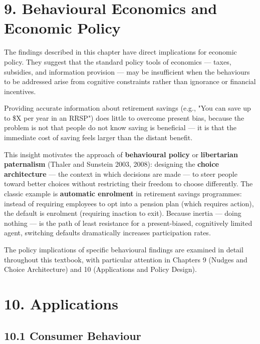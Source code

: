 \documentclass[12pt, letterpaper]{article}
\begin{document}
\medskip


\section{9. Behavioural Economics and Economic Policy}


The findings described in this chapter have direct implications for economic policy. They suggest that the standard policy tools of economics --- taxes, subsidies, and information provision --- may be insufficient when the behaviours to be addressed arise from cognitive constraints rather than ignorance or financial incentives.

Providing accurate information about retirement savings (e.g., "You can save up to \$X per year in an RRSP") does little to overcome present bias, because the problem is not that people do not know saving is beneficial --- it is that the immediate cost of saving feels larger than the distant benefit.

This insight motivates the approach of \textbf{behavioural policy} or \textbf{libertarian paternalism} (Thaler and Sunstein 2003, 2008): designing the \textbf{choice architecture} --- the context in which decisions are made --- to steer people toward better choices without restricting their freedom to choose differently. The classic example is \textbf{automatic enrolment} in retirement savings programmes: instead of requiring employees to opt into a pension plan (which requires action), the default is enrolment (requiring inaction to exit). Because inertia --- doing nothing --- is the path of least resistance for a present-biased, cognitively limited agent, switching defaults dramatically increases participation rates.

The policy implications of specific behavioural findings are examined in detail throughout this textbook, with particular attention in Chapters 9 (Nudges and Choice Architecture) and 10 (Applications and Policy Design).

\medskip


\section{10. Applications}



\subsection{10.1 Consumer Behaviour}
\end{document}
